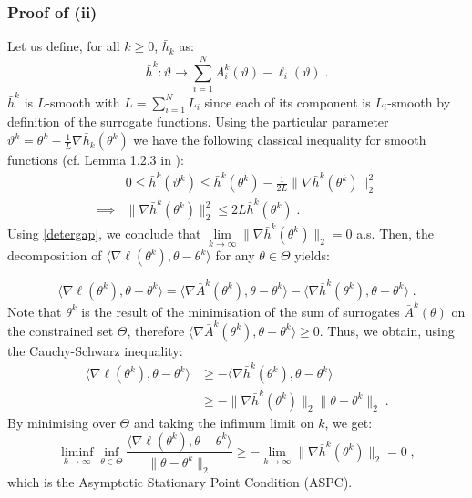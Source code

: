 \documentclass[11pt]{article}
\theoremstyle{plain}
\def\eqs{\;}
\newcommand{\loglike}{\ell}
\theoremstyle{plain}
\theoremstyle{definition}
\begin{document}
\subsubsection{Proof of (ii)}
Let us define, for all $k \geq 0$, $\bar{h}_k$ as:
\begin{equation}\label{smoothH}
\bar{h}^k : \vartheta \to \sum_{i=1}^N{A^k_{i}(\vartheta) - \loglike_i(\vartheta)}\eqs.
\end{equation}
$\bar{h}^k$ is $L$-smooth with $L = \sum_{i=1}^N{L_i}$ since each of its component is $L_i$-smooth by definition of the surrogate functions. Using the particular parameter $\vartheta^k = \theta^k - \frac{1}{L}\nabla\bar{h}_k(\theta^k) $ we have the following classical inequality for smooth functions (cf. Lemma 1.2.3 in \citep{nesterov2007Gradient}):
\begin{align}\label{nest}
& 0 \leq \bar{h}^k(\vartheta^k) \leq \bar{h}^k(\theta^k) - \frac{1}{2L}\|\nabla\bar{h}^k(\theta^k)\|_2^2\\
\implies &  \|\nabla\bar{h}^k(\theta^k)\|_2^2 \leq 2L\bar{h}^k(\theta^k)\eqs.
\end{align}
Using \eqref{detergap}, we conclude that $\lim \limits_{k \to \infty}\|\nabla\bar{h}^k(\theta^k)\|_2 = 0$ a.s. Then, the decomposition of $\langle \nabla \loglike(\theta^k),\theta - \theta^k \rangle$ for any $\theta \in \Theta$ yields:

\begin{equation}
\langle \nabla \loglike(\theta^k),\theta - \theta^k \rangle = \langle \nabla \bar{A}^k(\theta^k), \theta - \theta^k \rangle - \langle \nabla\bar{h}^k(\theta^k),\theta - \theta^k \rangle\eqs.
\end{equation}
Note that $\theta^k$ is the result of the minimisation of the sum of surrogates $\bar{A}^k(\theta)$ on the constrained set $\Theta$, therefore  $\langle \nabla \bar{A}^k(\theta^k), \theta - \theta^k \rangle \geq 0$. Thus, we obtain, using the Cauchy-Schwarz inequality:
\begin{align}
\langle \nabla \loglike(\theta^k),\theta - \theta^k \rangle & \geq - \langle \nabla\bar{h}^k(\theta^k),\theta - \theta^k \rangle\\
& \geq - \|\nabla\bar{h}^k(\theta^k)\|_2 \|\theta - \theta^k\|_2 \eqs.
\end{align}
By minimising over $\Theta$ and taking the infimum limit on $k$, we get:
\begin{equation}
\liminf \limits_{k \to \infty}\inf \limits_{\theta \in \Theta} \frac{\langle \nabla \loglike(\theta^k),\theta - \theta^k \rangle}{\|\theta - \theta^k\|_2} \geq - \lim \limits_{k \to \infty}\|\nabla\bar{h}^k(\theta^k)\|_2 = 0 \eqs,
\end{equation}
which is the Asymptotic Stationary Point Condition  (ASPC).
\clearpage



\newpage
\printglossaries
\end{document}
